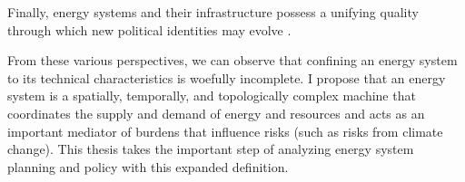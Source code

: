 Finally, energy systems and their infrastructure possess a unifying quality
through which new political identities may evolve \cite{bridge_energy_2018}.

From these various perspectives, we can observe that confining an energy system
to its technical characteristics is woefully incomplete. I propose that an
energy system is a spatially, temporally, and topologically complex machine that
coordinates the supply and demand of energy and resources and acts as an important mediator of
burdens that influence risks (such as risks from climate change). This thesis takes the important step
of analyzing energy system planning and policy with this expanded definition.








